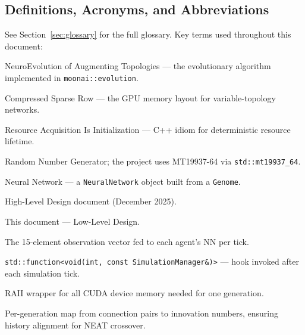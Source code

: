 \subsection{Definitions, Acronyms, and Abbreviations}
\label{sec:defs}

See Section~\ref{sec:glossary} for the full glossary.  Key terms used throughout this
document:

\begin{description}[style=nextline,leftmargin=3.5cm,font=\ttfamily]
  \item[NEAT]  NeuroEvolution of Augmenting Topologies — the evolutionary algorithm
    implemented in \texttt{moonai::evolution}.
  \item[CSR]   Compressed Sparse Row — the GPU memory layout for variable-topology
    networks.
  \item[RAII]  Resource Acquisition Is Initialization — C++ idiom for deterministic
    resource lifetime.
  \item[RNG]   Random Number Generator; the project uses MT19937-64 via
    \texttt{std::mt19937\_64}.
  \item[NN]    Neural Network — a \texttt{NeuralNetwork} object built from a
    \texttt{Genome}.
  \item[HLD]   High-Level Design document (December 2025).
  \item[LLD]   This document — Low-Level Design.
  \item[SensorInput]  The 15-element observation vector fed to each agent's NN per tick.
  \item[TickCallback] \texttt{std::function<void(int, const SimulationManager\&)>} —
    hook invoked after each simulation tick.
  \item[GpuBatch] RAII wrapper for all CUDA device memory needed for one generation.
  \item[InnovationTracker] Per-generation map from connection pairs to innovation
    numbers, ensuring history alignment for NEAT crossover.
\end{description}
